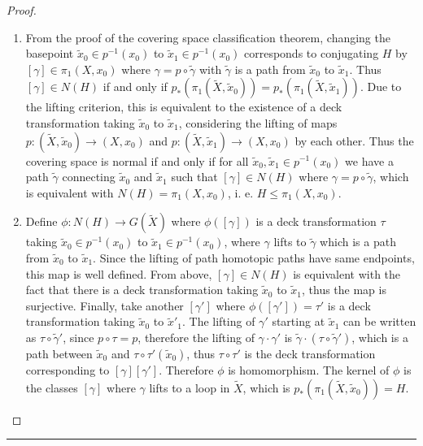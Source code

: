 \begin{proof}
\begin{enumerate}
\item From the proof of the covering space classification theorem, changing the basepoint $\tilde{x}_0\in p^{-1}(x_0)$ to $\tilde{x}_1\in p^{-1}(x_0)$ corresponds to conjugating $H$ by $[\gamma]\in \pi_1(X,x_0)$ where $\gamma=p\circ \tilde{\gamma}$ with $\tilde{\gamma}$ is a path from $\tilde{x}_0$ to $\tilde{x}_1$. Thus $[\gamma]\in N(H)$ if and only if $p_*(\pi_1(\tilde{X},\tilde{x}_0))=p_*(\pi_1(\tilde{X},\tilde{x}_1))$. Due to the lifting criterion, this is equivalent to the existence of a deck transformation taking $\tilde{x}_0$ to $\tilde{x}_1$, considering the lifting of maps $p:(\tilde{X},\tilde{x}_0)\rightarrow (X,x_0)$ and $p:(\tilde{X},\tilde{x}_1)\rightarrow (X,x_0)$ by each other. Thus the covering space is normal if and only if for all $\tilde{x}_0,\tilde{x}_1\in p^{-1}(x_0)$ we have a path $\tilde{\gamma}$ connecting $\tilde{x}_0$ and $\tilde{x}_1$ such that $[\gamma]\in N(H)$ where $\gamma=p\circ \tilde{\gamma}$, which is equivalent with $N(H)=\pi_1(X,x_0)$, i. e. $H\leq \pi_1(X,x_0)$.

\item Define $\phi:N(H)\rightarrow G(\tilde{X})$ where $\phi([\gamma])$ is a deck transformation $\tau$ taking $\tilde{x}_0\in p^{-1}(x_0)$ to $\tilde{x}_1\in p^{-1}(x_0)$, where $\gamma$ lifts to $\tilde{\gamma}$ which is a path from $\tilde{x}_0$ to $\tilde{x}_1$. Since the lifting of path homotopic paths have same endpoints, this map is well defined. From above, $[\gamma]\in N(H)$ is equivalent with the fact that there is a deck transformation taking $\tilde{x}_0$ to $\tilde{x}_1$, thus the map is surjective. Finally, take another $[\gamma']$ where $\phi([\gamma'])=\tau'$ is a deck transformation taking $\tilde{x}_0$ to $\tilde{x}'_1$. The lifting of $\gamma'$ starting at $\tilde{x}_1$ can be written as $\tau\circ \tilde{\gamma}'$, since $p\circ \tau=p$, therefore the lifting of $\gamma\cdot\gamma'$ is $\tilde{\gamma}\cdot(\tau\circ \tilde{\gamma}')$, which is a path between $\tilde{x}_0$ and $\tau\circ \tau'(\tilde{x}_0)$, thus $\tau\circ \tau'$ is the deck transformation corresponding to $[\gamma][\gamma']$. Therefore $\phi$ is homomorphism. The kernel of $\phi$ is the classes $[\gamma]$ where $\gamma$ lifts to a loop in $\tilde{X}$, which is $p_*(\pi_1(\tilde{X},\tilde{x}_0))=H$.
\end{enumerate}
\end{proof}
\noindent\rule{\textwidth}{1pt}
\newline